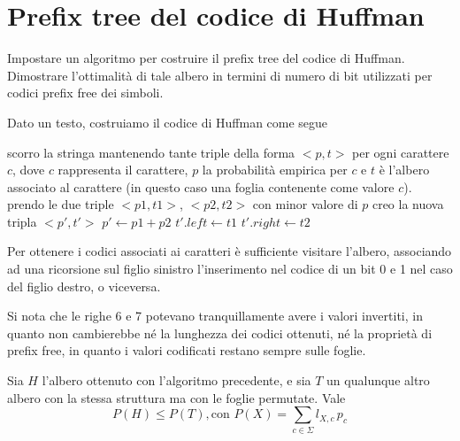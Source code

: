 \chapter{Prefix tree del codice di Huffman}

\begin{problem*}
  Impostare un algoritmo per costruire il prefix tree del codice di
  Huffman. Dimostrare l'ottimalit\`a di tale albero in termini di numero
  di bit utilizzati per codici prefix free dei simboli.
\end{problem*}

Dato un testo, costruiamo il codice di Huffman come segue

\begin{algorithm}
    \caption{Algoritmo per la costruzione del prefix tree del codice di Huffman}
    \begin{algorithmic}[1]
        \State scorro la stringa mantenendo tante triple della forma $<p, t>$ per ogni carattere $c$, dove $c$ rappresenta il carattere, $p$ la probabilità empirica per $c$ e $t$ è l'albero associato al carattere (in questo caso una foglia contenente come valore $c$).
            \State prendo le due triple $<p1, t1>$, $<p2, t2>$ con minor valore di $p$
            \State creo la nuova tripla $<p', t'>$
            \State $p' \gets p1 + p2$
            \State $t'.left \gets t1$
            \State $t'.right \gets t2$
        \EndWhile
    \end{algorithmic}
\end{algorithm}

Per ottenere i codici associati ai caratteri è sufficiente visitare l'albero, associando ad una ricorsione sul figlio sinistro l'inserimento nel codice di un bit 0 e 1 nel caso del figlio destro, o viceversa.

Si nota che le righe 6 e 7 potevano tranquillamente avere i valori invertiti, in quanto non cambierebbe né la lunghezza dei codici ottenuti, né la proprietà di prefix free, in quanto i valori codificati restano sempre sulle foglie.

\begin{lemma}[Ottimalità]
Sia $H$ l'albero ottenuto con l'algoritmo precedente, e sia $T$ un qualunque altro albero con la stessa struttura ma con le foglie permutate. Vale
\[
    P(H) \le P(T), \mbox{con } P(X) = \sum_{c \in \Sigma} l_{X, c} \, p_c
\]
\end{lemma}

